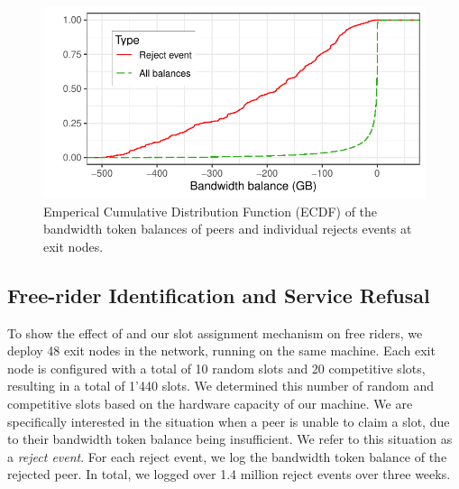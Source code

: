 
\begin{figure}[t]
	\centering
	\includegraphics[width=.8\linewidth]{trustchain/assets/exit_node_rejects}
	\caption{Emperical Cumulative Distribution Function (ECDF) of the bandwidth token balances of peers and individual rejects events at exit nodes.}
	\label{fig:exit_node_rejects}
\end{figure}

\subsection{Free-rider Identification and Service Refusal}
To show the effect of \TrustChain{} and our slot assignment mechanism on free riders, we deploy 48 exit nodes in the \Tribler{} network, running on the same machine.
Each exit node is configured with a total of 10 random slots and 20 competitive slots, resulting in a total of 1'440 slots.
We determined this number of random and competitive slots based on the hardware capacity of our machine.
We are specifically interested in the situation when a peer is unable to claim a slot, due to their bandwidth token balance being insufficient.
We refer to this situation as a \emph{reject event}.
For each reject event, we log the bandwidth token balance of the rejected peer.
In total, we logged over 1.4 million reject events over three weeks.

